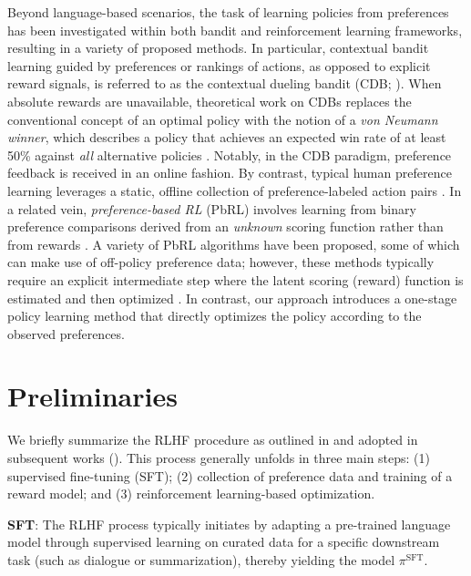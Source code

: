 Beyond language-based scenarios, the task of learning policies from preferences has been investigated within both bandit and reinforcement learning frameworks, resulting in a variety of proposed methods. In particular, contextual bandit learning guided by preferences or rankings of actions, as opposed to explicit reward signals, is referred to as the contextual dueling bandit (CDB; \cite{yue2012karmed,dudik2015contextual}). When absolute rewards are unavailable, theoretical work on CDBs replaces the conventional concept of an optimal policy with the notion of a \textit{von Neumann winner}, which describes a policy that achieves an expected win rate of at least 50\% against \textit{all} alternative policies \citep{dudik2015contextual}. Notably, in the CDB paradigm, preference feedback is received in an online fashion. By contrast, typical human preference learning leverages a static, offline collection of preference-labeled action pairs \citep{yan2022human}. In a related vein, \textit{preference-based RL} (PbRL) involves learning from binary preference comparisons derived from an \textit{unknown} scoring function rather than from rewards \citep{BusaFekete2014,ruiz2023dueling}. A variety of PbRL algorithms have been proposed, some of which can make use of off-policy preference data; however, these methods typically require an explicit intermediate step where the latent scoring (reward) function is estimated and then optimized \citep{jain2013learning,BusaFekete2014,christiano2017deep,sadigh2017active,kupcsik2018learning}. In contrast, our approach introduces a one-stage policy learning method that directly optimizes the policy according to the observed preferences.

\section{Preliminaries}\label{section:prelims}

We briefly summarize the RLHF procedure as outlined in \citeauthor{ziegler2020finetuning} and adopted in subsequent works (\citep{stiennon2022learning, bai2022training, ouyang2022training}). This process generally unfolds in three main steps: (1) supervised fine-tuning (SFT); (2) collection of preference data and training of a reward model; and (3) reinforcement learning-based optimization.

\textbf{SFT}: The RLHF process typically initiates by adapting a pre-trained language model through supervised learning on curated data for a specific downstream task (such as dialogue or summarization), thereby yielding the model $\pi^\text{SFT}$.

